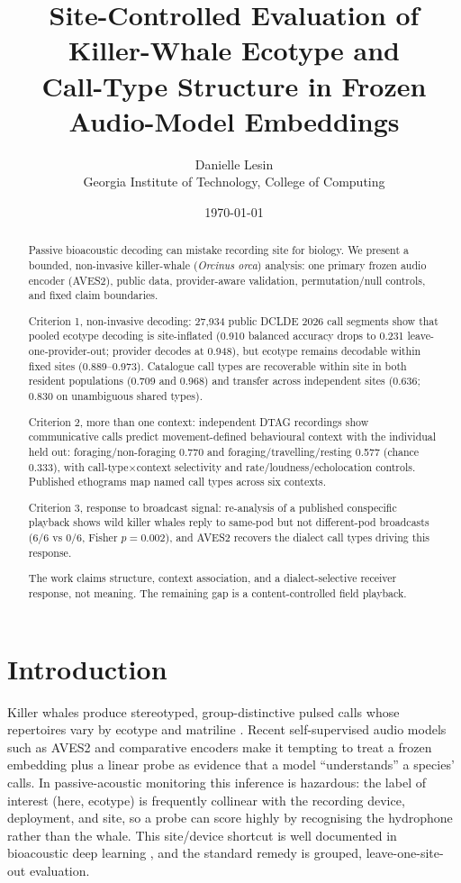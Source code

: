 \documentclass[11pt]{article}
\title{Site-Controlled Evaluation of Killer-Whale Ecotype and\\
Call-Type Structure in Frozen Audio-Model Embeddings}
\author{Danielle Lesin\\\small Georgia Institute of Technology, College of Computing}
\date{\today}
\begin{document}
\maketitle

\begin{abstract}
Passive bioacoustic decoding can mistake recording site for biology. We present a bounded,
non-invasive killer-whale (\emph{Orcinus orca}) analysis: one primary frozen audio encoder
(AVES2), public data, provider-aware validation, permutation/null controls, and fixed
claim boundaries.

Criterion 1, non-invasive decoding: 27{,}934 public DCLDE 2026 call segments show that
pooled ecotype decoding is site-inflated (0.910 balanced accuracy drops to 0.231
leave-one-provider-out; provider decodes at 0.948), but ecotype remains decodable within
fixed sites (0.889--0.973). Catalogue call types are recoverable within site in both
resident populations (0.709 and 0.968) and transfer across independent sites (0.636; 0.830
on unambiguous shared types).

Criterion 2, more than one context: independent DTAG recordings show communicative calls
predict movement-defined behavioural context with the individual held out:
foraging/non-foraging 0.770 and foraging/travelling/resting 0.577 (chance 0.333), with
call-type$\times$context selectivity and rate/loudness/echolocation controls. Published
ethograms map named call types across six contexts.

Criterion 3, response to broadcast signal: re-analysis of a published conspecific
playback shows wild killer whales reply to same-pod but not different-pod broadcasts (6/6
vs 0/6, Fisher $p=0.002$), and AVES2 recovers the dialect call types driving this response.

The work claims structure, context association, and a dialect-selective receiver
response, not meaning. The remaining gap is a content-controlled field playback.
\end{abstract}

\section{Introduction}
Killer whales produce stereotyped, group-distinctive pulsed calls whose repertoires vary by
ecotype and matriline \citep{ford1989,foote2008,filatova2015,yurk2002}. Recent
self-supervised audio models such as AVES2 \citep{hagiwara2023aves,chen2022beats} and
comparative encoders \citep{robinson2024naturelm,hamer2025perch} make it tempting to treat a
frozen embedding plus a linear probe as evidence that a model ``understands'' a species'
calls. In passive-acoustic monitoring this inference is hazardous: the label of interest
(here, ecotype) is frequently collinear with the recording device, deployment, and site, so
a probe can score highly by recognising the hydrophone rather than the whale. This
site/device shortcut is well documented in bioacoustic deep learning
\citep{stowell2022,ghani2023}, and the standard remedy is grouped, leave-one-site-out
evaluation.
\end{document}
